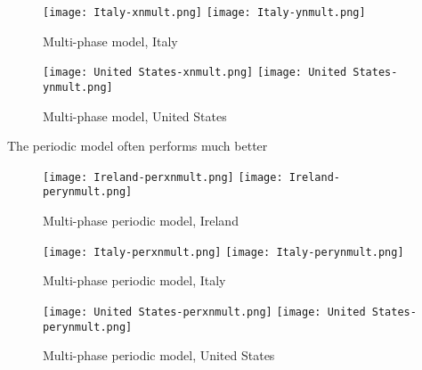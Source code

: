 \begin{figure}[H]
  \texttt{[image: Italy-xnmult.png]} \label{fig:italy-xnmult}
\endminipage\hfill
{}
  \texttt{[image: Italy-ynmult.png]} \label{fig:italy-ynmult}
\endminipage
\caption{Multi-phase model, Italy}
\end{figure}

\begin{figure}[H]
  \texttt{[image: United States-xnmult.png]} \label{fig:usa-xnmult}
\endminipage\hfill
{}
  \texttt{[image: United States-ynmult.png]} \label{fig:usa-ynmult}
\endminipage
\caption{Multi-phase model, United States}
\end{figure}


The periodic model often performs much better

\begin{figure}[H]
  \texttt{[image: Ireland-perxnmult.png]} \label{fig:ireland-perxnmult}
\endminipage\hfill
{}
  \texttt{[image: Ireland-perynmult.png]} \label{fig:ireland-perynmult}
\endminipage
\caption{Multi-phase periodic model, Ireland}
\end{figure}

\begin{figure}[H]
  \texttt{[image: Italy-perxnmult.png]} \label{fig:italy-perxnmult}
\endminipage\hfill
{}
  \texttt{[image: Italy-perynmult.png]} \label{fig:italy-perynmult}
\endminipage
\caption{Multi-phase periodic model, Italy}
\end{figure}

\begin{figure}[H]
  \texttt{[image: United States-perxnmult.png]} \label{fig:usa-perxnmult}
\endminipage\hfill
{}
  \texttt{[image: United States-perynmult.png]} \label{fig:usa-perynmult}
\endminipage
\caption{Multi-phase periodic model, United States}
\end{figure}
